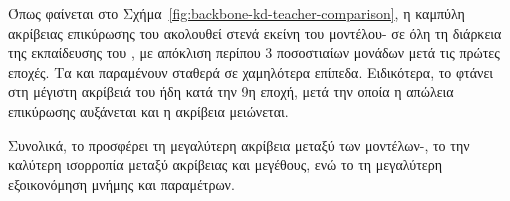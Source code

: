 Όπως φαίνεται στο Σχήμα~\ref{fig:backbone-kd-teacher-comparison}, η
καμπύλη ακρίβειας επικύρωσης του  ακολουθεί στενά εκείνη
του μοντέλου- σε όλη τη διάρκεια της εκπαίδευσης του
, με απόκλιση περίπου \(3\) ποσοστιαίων μονάδων μετά τις
πρώτες εποχές. Τα  και  παραμένουν σταθερά σε χαμηλότερα
επίπεδα. Ειδικότερα, το  φτάνει στη μέγιστη ακρίβειά του ήδη
κατά την 9η εποχή, μετά την οποία η απώλεια επικύρωσης αυξάνεται και η
ακρίβεια μειώνεται.

Συνολικά, το  προσφέρει τη μεγαλύτερη ακρίβεια μεταξύ
των μοντέλων-, το  την καλύτερη ισορροπία
μεταξύ ακρίβειας και μεγέθους, ενώ το  τη μεγαλύτερη εξοικονόμηση μνήμης και παραμέτρων.
